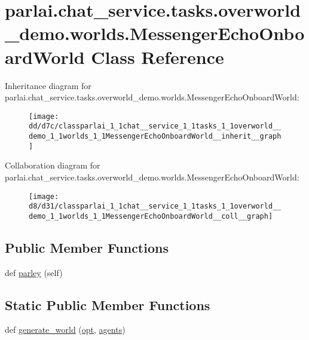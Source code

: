 \hypertarget{classparlai_1_1chat__service_1_1tasks_1_1overworld__demo_1_1worlds_1_1MessengerEchoOnboardWorld}{}\section{parlai.\+chat\+\_\+service.\+tasks.\+overworld\+\_\+demo.\+worlds.\+Messenger\+Echo\+Onboard\+World Class Reference}
\label{classparlai_1_1chat__service_1_1tasks_1_1overworld__demo_1_1worlds_1_1MessengerEchoOnboardWorld}


Inheritance diagram for parlai.\+chat\+\_\+service.\+tasks.\+overworld\+\_\+demo.\+worlds.\+Messenger\+Echo\+Onboard\+World\+:
\nopagebreak
\begin{figure}[H]
\begin{center}
\leavevmode
\texttt{[image: dd/d7c/classparlai\_1\_1chat\_\_service\_1\_1tasks\_1\_1overworld\_\_demo\_1\_1worlds\_1\_1MessengerEchoOnboardWorld\_\_inherit\_\_graph]}
\end{center}
\end{figure}


Collaboration diagram for parlai.\+chat\+\_\+service.\+tasks.\+overworld\+\_\+demo.\+worlds.\+Messenger\+Echo\+Onboard\+World\+:
\nopagebreak
\begin{figure}[H]
\begin{center}
\leavevmode
\texttt{[image: d8/d31/classparlai\_1\_1chat\_\_service\_1\_1tasks\_1\_1overworld\_\_demo\_1\_1worlds\_1\_1MessengerEchoOnboardWorld\_\_coll\_\_graph]}
\end{center}
\end{figure}
\subsection*{Public Member Functions}
\begin{DoxyCompactItemize}
\item 
def \hyperlink{classparlai_1_1chat__service_1_1tasks_1_1overworld__demo_1_1worlds_1_1MessengerEchoOnboardWorld_aaf4f7b875e6a7be02164f4f63463e6b0}{parley} (self)
\end{DoxyCompactItemize}
\subsection*{Static Public Member Functions}
\begin{DoxyCompactItemize}
\item 
def \hyperlink{classparlai_1_1chat__service_1_1tasks_1_1overworld__demo_1_1worlds_1_1MessengerEchoOnboardWorld_ab579e33ffbc640197255282f56f6fed8}{generate\+\_\+world} (\hyperlink{classparlai_1_1core_1_1worlds_1_1World_a3640d92718acd3e6942a28c1ab3678bd}{opt}, \hyperlink{classparlai_1_1core_1_1worlds_1_1World_a728f75194cc26ea4035047c46cf62608}{agents})
\end{DoxyCompactItemize}

